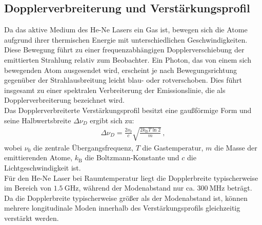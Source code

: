\subsection{Dopplerverbreiterung und Verstärkungsprofil}
\label{sec:dopplerverbreiterung}
Da das aktive Medium des He-Ne Lasers ein Gas ist, bewegen sich die Atome aufgrund ihrer thermischen Energie mit unterschiedlichen Geschwindigkeiten. 
Diese Bewegung führt zu einer frequenzabhängigen Dopplerverschiebung der emittierten Strahlung relativ zum Beobachter. 
Ein Photon, das von einem sich bewegenden Atom ausgesendet wird, erscheint je nach Bewegungsrichtung gegenüber der Strahlausbreitung leicht blau- oder rotverschoben. 
Dies führt insgesamt zu einer spektralen Verbreiterung der Emissionslinie, die als Dopplerverbreiterung bezeichnet wird.\\
Das Dopplerverbreiterte Verstärkungsprofil besitzt eine gaußförmige Form und seine Halbwertsbreite $\Delta \nu_D$ ergibt sich zu:
\begin{align}
    \Delta \nu_D = \frac{2\nu_0}{c} \sqrt{ \frac{2k_{\text{B}}T \ln 2}{m} }\,, \label{eqn:dopplerverbreiterung}
\end{align}
wobei $\nu_0$ die zentrale Übergangsfrequenz, $T$ die Gastemperatur, $m$ die Masse der emittierenden Atome, $k_{\text{B}}$ die Boltzmann-Konstante und $c$ die Lichtgeschwindigkeit ist.\\
Für den He-Ne Laser bei Raumtemperatur liegt die Dopplerbreite typischerweise im Bereich von $\SI{1.5}{\giga\hertz}$, während der Modenabstand nur ca. $\SI{300}{\mega\hertz}$ beträgt. 
Da die Dopplerbreite typischerweise größer als der Modenabstand ist, können mehrere longitudinale Moden innerhalb des Verstärkungsprofils gleichzeitig verstärkt werden. \cite{photonics} \cite{laserspektroskopie}



